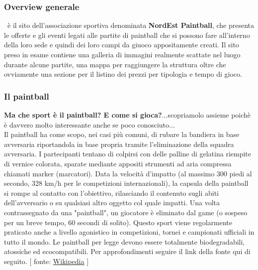 \documentclass[../Relazione.tex]{subfiles}
\begin{document}
	\subsubsection{Overview generale}
	\paint\ è il sito dell'associazione sportiva denominata \textbf{NordEst Paintball}, che presenta le offerte e gli eventi legati alle partite di paintball che si possono fare all'interno della loro sede e quindi dei loro campi da giuoco appositamente creati.
	Il sito preso in esame contiene una galleria di immagini realmente scattate nel luogo durante alcune partite, una mappa per raggiungere la struttura oltre che ovviamente una sezione per il listino dei prezzi per tipologia e tempo di gioco.
\newpage
	\subsubsection{Il paintball}
	\textbf{Ma che sport è il paintball? E come si gioca?}...scopriamolo assieme poichè è davvero molto interessante anche se poco conosciuto...\\
	Il paintball ha come scopo, nei casi più comuni, di rubare la bandiera in base avversaria riportandola in base propria tramite l'eliminazione della squadra avversaria.
	I partecipanti tentano di colpirsi con delle palline di gelatina riempite di vernice colorata, sparate mediante appositi strumenti ad aria compressa chiamati marker (marcatori). Data la velocità d'impatto (al massimo 300 piedi al secondo, 328 km/h per le competizioni internazionali), la capsula della paintball si rompe al contatto con l'obiettivo, rilasciando il contenuto sugli abiti dell'avversario o su qualsiasi altro oggetto col quale impatti. Una volta contrassegnato da una "paintball", un giocatore è eliminato dal game (o sospeso per un breve tempo, 60 secondi di solito). Questo sport viene regolarmente praticato anche a livello agonistico in competizioni, tornei e campionati ufficiali in tutto il mondo. Le paintball per legge devono essere totalmente biodegradabili, atossiche ed ecocompatibili.
	Per approfondimenti seguire il link della fonte qui di seguito.
	[ fonte: \href{https://it.wikipedia.org/wiki/Paintball}{Wikipedia} ]\vspace{1cm}
\end{document}
